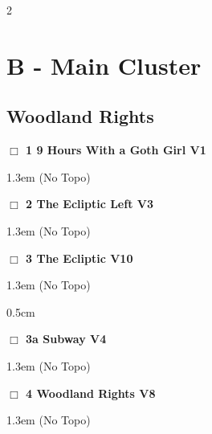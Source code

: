 \begin{multicols}{2}
\section{B - Main Cluster}\label{sa:Main Cluster}
\needspace{10em}
\subsection*{Woodland Rights}\label{bf:Woodland Rights}
\needspace{2em}
\label{rt:9 Hours With a Goth Girl}
\colorbox{green!20}{
\parbox{0.95\linewidth}{
\hspace{-1ex}\textbf{$\Box$
1 9 Hours With a Goth Girl V1  
}}}
\begin{adjustwidth}{1.3em}{}			
  (No Topo)
\end{adjustwidth}
\needspace{2em}
\label{rt:The Ecliptic Left}
\colorbox{green!20}{
\parbox{0.95\linewidth}{
\hspace{-1ex}\textbf{$\Box$
2 The Ecliptic Left V3  
}}}
\begin{adjustwidth}{1.3em}{}			
  (No Topo)
\end{adjustwidth}
\needspace{2em}
\label{rt:The Ecliptic}
\colorbox{red!20}{
\parbox{0.95\linewidth}{
\hspace{-1ex}\textbf{$\Box$
3 The Ecliptic V10  
}}}
\begin{adjustwidth}{1.3em}{}			
  (No Topo)
\end{adjustwidth}
\begin{adjustwidth}{0.5cm}{}				
\needspace{4em}
\needspace{2em}
\label{vr:Subway}
\colorbox{RoyalBlue!20}{
\parbox{0.95\linewidth}{
\hspace{-1ex}\textbf{$\Box$
3a Subway V4  
}}}
\begin{adjustwidth}{1.3em}{}			
  (No Topo)
\end{adjustwidth}
\end{adjustwidth}
\needspace{2em}
\label{rt:Woodland Rights}
\colorbox{Goldenrod!50}{
\parbox{0.95\linewidth}{
\hspace{-1ex}\textbf{$\Box$
4 Woodland Rights V8  
}}}
\begin{adjustwidth}{1.3em}{}			
  (No Topo)
\end{adjustwidth}
\needspace{10em}

\end{multicols}
